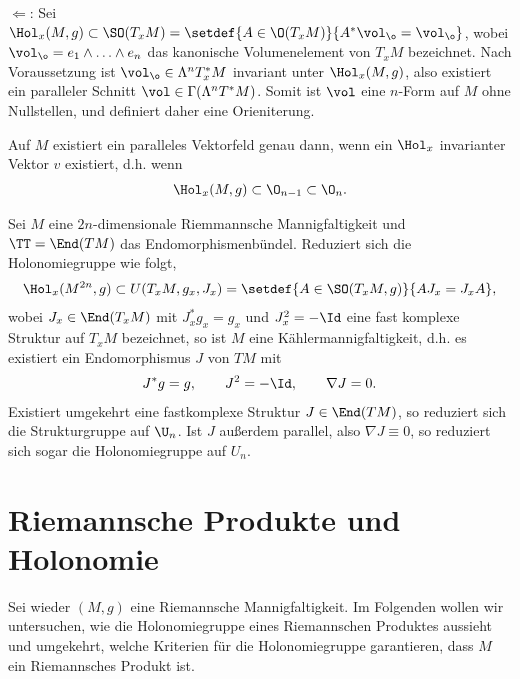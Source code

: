 \documentclass[%
	paper=a5,%
	fleqn,%
	DIV=18,%
	BCOR=0mm,
	fontsize=11pt,
	titlepage=false,%
	bibliography=totoc,
	DIV=18,%
	twoside=true,
	pdftitle=Riemannsche Geometrie,
	pdfauthor=Uwe Semmelmann,
	numbers=noendperiod]%
	{scrbook}
\begin{document}
\begin{ex}
\begin{exenum}
$\Leftarrow$: Sei $\Hol_{x}(M,g) \subset \SO(T_{x}M) = \setdef{A \in \O(T_{x}M)}{A^*\vol_{\o} = \vol_{\o}}$, wobei $\vol_{\o} = e_{1}\wedge \ldots \wedge e_{n}$ das kanonische Volumenelement von $T_{x}M$ bezeichnet. Nach Voraussetzung ist $\vol_{\o}\in \Lambda^n T_{x}^*M$ invariant unter $\Hol_{x}(M,g)$, also existiert ein paralleler Schnitt $\vol \in \Gamma(\Lambda^n T^*M)$. Somit ist $\vol$ eine $n$-Form auf $M$ ohne Nullstellen, und definiert daher eine Orieniterung.
\item Auf $M$ existiert ein paralleles Vektorfeld genau dann, wenn ein $\Hol_{x}$ invarianter Vektor $v$ existiert, d.h. wenn
\begin{align*}
\Hol_{x}(M,g) \subset \O_{n-1}\subset \O_{n}.
\end{align*}
\item Sei $M$ eine $2n$-dimensionale Riemmannsche Mannigfaltigkeit und $\TT = \End(TM)$ das Endomorphismenbündel. Reduziert sich die Holonomiegruppe wie folgt,
\begin{align*}
\Hol_{x}(M^{2n},g) \subset U(T_{x}M,g_{x},J_{x}) = \setdef{A\in \SO(T_{x}M,g)}{AJ_{x} = J_{x}A},
\end{align*}
wobei $J_{x}\in \End(T_{x}M)$ mit $J_{x}^*g_{x} = g_{x}$ und $J_{x}^2 = -\Id$ eine fast komplexe Struktur auf $T_{x}M$ bezeichnet, so ist $M$ eine Kählermannigfaltigkeit, d.h. es existiert ein Endomorphismus $J$ von $TM$ mit
\begin{align*}
J^*g = g,\qquad J^2 = -\Id,\qquad \nabla J = 0.
\end{align*}
Existiert umgekehrt eine fastkomplexe Struktur $J\in \End(TM)$, so reduziert sich die Strukturgruppe auf $\U_{n}$. Ist $J$ außerdem parallel, also $\nabla J \equiv 0$, so reduziert sich sogar die Holonomiegruppe auf $U_{n}$.\bsp
\end{exenum}
\end{ex}

\section{Riemannsche Produkte und Holonomie}

Sei wieder $(M,g)$ eine Riemannsche Mannigfaltigkeit. Im Folgenden wollen wir untersuchen, wie die Holonomiegruppe eines Riemannschen Produktes aussieht und umgekehrt, welche Kriterien für die Holonomiegruppe garantieren, dass $M$ ein Riemannsches Produkt ist.
\end{document}

